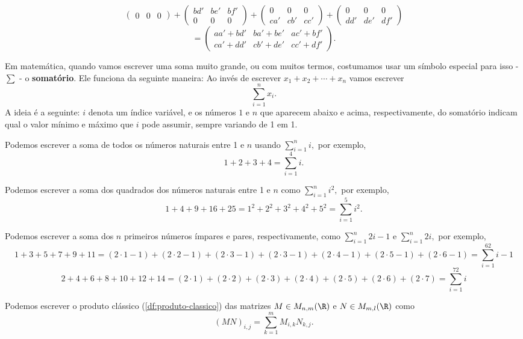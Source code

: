 \begin{ex}
\[\begin{pmatrix}
0 & 0 & 0
\end{pmatrix}+\begin{pmatrix}
bd' & be' & bf'\\
0&0&0
\end{pmatrix}+\begin{pmatrix}
0&0&0\\
ca' &cb' & cc'
\end{pmatrix}+\begin{pmatrix}
0&0&0\\
dd' & de' & df'
\end{pmatrix}\]
\[=\begin{pmatrix}
aa'+bd' &ba'+be' & ac'+bf'\\
ca'+dd' & cb'+de' & cc'+df'
\end{pmatrix}.\]
\end{ex}

\begin{rmk}
	Em matemática, quando vamos escrever uma soma muito grande, ou com muitos termos, costumamos usar um símbolo especial para isso - $\sum$ - o \textbf{somatório}. Ele funciona da seguinte maneira: Ao invés de escrever $x_1+x_2+\cdots+x_n$ vamos escrever
	\[\sum_{i=1}^n x_i.\] A ideia é a seguinte: $i$ denota um índice variável, e os números $1$ e $n$ que aparecem abaixo e acima, respectivamente, do somatório indicam qual o valor mínimo e máximo que $i$ pode assumir, sempre variando de 1 em 1.
\end{rmk}

\begin{ex}
	Podemos escrever a soma de todos os números naturais entre 1 e $n$ usando \(\sum_{i=1}^ni,\) por exemplo,
	\[1+2+3+4=\sum_{i=1}^4i.\]
	
	Podemos escrever a soma dos quadrados dos números naturais entre 1 e $n$ como \(\sum_{i=1}^ni^2,\) por exemplo,
	\[1+4+9+16+25=1^2+2^2+3^2+4^2+5^2=\sum_{i=1}^5i^2.\]
	
	Podemos escrever a soma dos $n$ primeiros números ímpares e pares, respectivamente, como $\sum_{i=1}^n 2i-1\text{ e }\sum_{i=1}^n2i,$ por exemplo,
	\[1+3+5+7+9+11 = (2\cdot1-1)+(2\cdot2-1)+(2\cdot3-1)+(2\cdot3-1)+(2\cdot4-1)+(2\cdot5-1)+(2\cdot6-1) = \sum_{i=1}^62i-1\]\[2+4+6+8+10+12+14 = (2\cdot 1)+(2\cdot2)+(2\cdot3)+(2\cdot4)+(2\cdot5)+(2\cdot6)+(2\cdot7 )= \sum_{i=1}^72i\]
	
	Podemos escrever o produto clássico (\ref{df:produto-classico}) das matrizes $M\in M_{n,m}(\R)$ e $N\in M_{m,l}(\R)$ como $$(MN)_{i,j}=\sum_{k=1}^{m}M_{i,k}N_{k,j}.$$
\end{ex}

